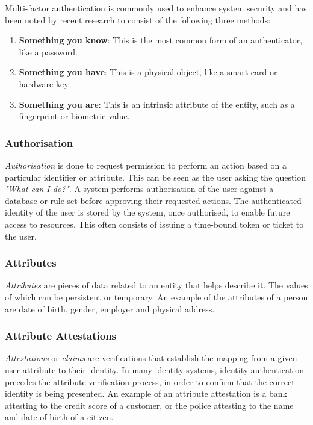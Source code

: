 Multi-factor authentication is commonly used to enhance system security and has been noted by recent research \cite{schneider_system_nodate} to consist of the following three methods:
\begin{enumerate}
	\item \textbf{Something you know}: This is the most common form of an authenticator, like a password.
	\item \textbf{Something you have}: This is a physical object, like a smart card or hardware key.
	\item \textbf{Something you are}: This is an intrinsic attribute of the entity, such as a fingerprint or biometric value.
\end{enumerate}

\subsubsection{Authorisation}
\textit{Authorisation} is done to request permission to perform an action based on a particular identifier or attribute. This can be seen as the user asking the question \textit{"What can I do?"}. A system performs authorisation of the user against a database or rule set before approving their requested actions. The authenticated identity of the user is stored by the system, once authorised, to enable future access to resources. This often consists of issuing a time-bound token or ticket to the user.

\subsubsection{Attributes}
\textit{Attributes} are pieces of data related to an entity that helps describe it. The values of which can be persistent or temporary. An example of the attributes of a person are date of birth, gender, employer and physical address.

\subsubsection{Attribute Attestations}
\textit{Attestations} or \textit{claims} are verifications that establish the mapping from a given user attribute to their identity. In many identity systems, identity authentication precedes the attribute verification process, in order to confirm that the correct identity is being presented. An example of an attribute attestation is a bank attesting to the credit score of a customer, or the police attesting to the name and date of birth of a citizen.

